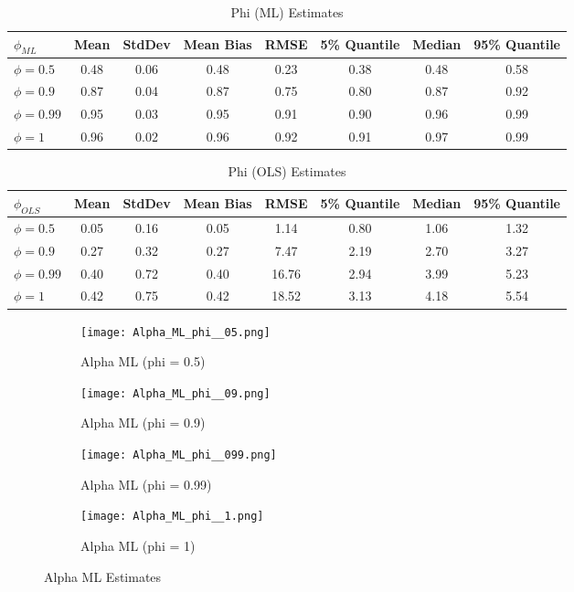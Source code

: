\documentclass[12pt]{article}
\begin{document}
\begin{table}[h!]
    \centering
    \begin{tabular}{lccccccc}
        \toprule
        $\phi_{ML}$ & Mean & StdDev & Mean Bias & RMSE & 5\% Quantile & Median & 95\% Quantile \\
        \midrule
        $\phi = 0.5$ & 0.48 & 0.06 & 0.48 & 0.23 & 0.38 & 0.48 & 0.58 \\
        $\phi = 0.9$ & 0.87 & 0.04 & 0.87 & 0.75 & 0.80 & 0.87 & 0.92 \\
        $\phi = 0.99$ & 0.95 & 0.03 & 0.95 & 0.91 & 0.90 & 0.96 & 0.99 \\
        $\phi = 1$ & 0.96 & 0.02 & 0.96 & 0.92 & 0.91 & 0.97 & 0.99 \\
        \bottomrule
    \end{tabular}
    \caption{Phi (ML) Estimates}
    \label{tab:phi_ml_estimates}
\end{table}

\begin{table}[h!]
    \centering
    \begin{tabular}{lccccccc}
        \toprule
        $\phi_{OLS}$ & Mean & StdDev & Mean Bias & RMSE & 5\% Quantile & Median & 95\% Quantile \\
        \midrule
        $\phi = 0.5$ & 0.05 & 0.16 & 0.05 & 1.14 & 0.80 & 1.06 & 1.32 \\
        $\phi = 0.9$ & 0.27 & 0.32 & 0.27 & 7.47 & 2.19 & 2.70 & 3.27 \\
        $\phi = 0.99$ & 0.40 & 0.72 & 0.40 & 16.76 & 2.94 & 3.99 & 5.23 \\
        $\phi = 1$ & 0.42 & 0.75 & 0.42 & 18.52 & 3.13 & 4.18 & 5.54 \\
        \bottomrule
    \end{tabular}
    \caption{Phi (OLS) Estimates}
    \label{tab:phi_ols_estimates}
\end{table}

\begin{figure}[H]
    \centering
    \begin{subfigure}[b]{0.45\textwidth}
        \texttt{[image: Alpha\_ML\_phi\_\_05.png]}
        \caption{Alpha ML (phi = 0.5)}
        \label{fig:alpha_ml_0_5}
    \end{subfigure}
    \hfill
    \begin{subfigure}[b]{0.45\textwidth}
        \texttt{[image: Alpha\_ML\_phi\_\_09.png]}
        \caption{Alpha ML (phi = 0.9)}
        \label{fig:alpha_ml_0_9}
    \end{subfigure}
    \vfill
    \begin{subfigure}[b]{0.45\textwidth}
        \texttt{[image: Alpha\_ML\_phi\_\_099.png]}
        \caption{Alpha ML (phi = 0.99)}
        \label{fig:alpha_ml_0_99}
    \end{subfigure}
    \hfill
    \begin{subfigure}[b]{0.45\textwidth}
        \texttt{[image: Alpha\_ML\_phi\_\_1.png]}
        \caption{Alpha ML (phi = 1)}
        \label{fig:alpha_ml_1}
    \end{subfigure}
    \caption{Alpha ML Estimates}
    \label{fig:alpha_ml}
\end{figure}
\end{document}
